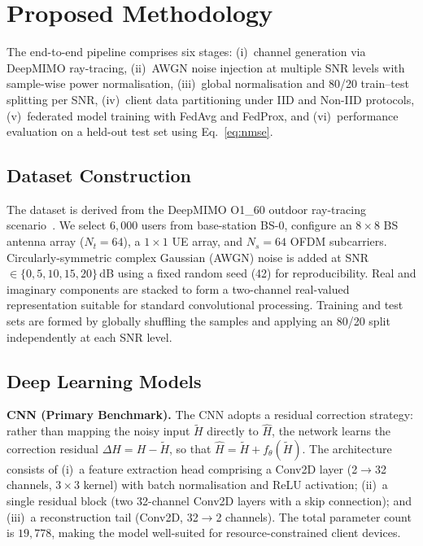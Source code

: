 \documentclass[runningheads]{llncs}
\begin{document}
\section{Proposed Methodology}
\label{sec:method}

The end-to-end pipeline comprises six stages:
(i)~channel generation via DeepMIMO ray-tracing,
(ii)~AWGN noise injection at multiple SNR levels with sample-wise power
normalisation,
(iii)~global normalisation and 80/20 train--test splitting per SNR,
(iv)~client data partitioning under IID and Non-IID protocols,
(v)~federated model training with FedAvg and FedProx,
and (vi)~performance evaluation on a held-out test set using
Eq.~\eqref{eq:nmse}.

\subsection{Dataset Construction}
\label{ssec:dataset}

The dataset is derived from the DeepMIMO O1\_60 outdoor ray-tracing
scenario~\cite{alkhateeb2019deepmimo}.  We select $6{,}000$ users from
base-station BS-0, configure an $8 \times 8$ BS antenna array ($N_t =
64$), a $1 \times 1$ UE array, and $N_s = 64$ OFDM subcarriers.
Circularly-symmetric complex Gaussian (AWGN) noise is added at
SNR~$\in \{0, 5, 10, 15, 20\}$\,dB using a fixed random seed (42) for
reproducibility.  Real and imaginary components are stacked to form a
two-channel real-valued representation suitable for standard
convolutional processing.  Training and test sets are formed by globally
shuffling the samples and applying an 80/20 split independently at each
SNR level.

\subsection{Deep Learning Models}
\label{ssec:models}

\textbf{CNN (Primary Benchmark).}
The CNN adopts a residual correction strategy: rather than mapping the
noisy input $\tilde{H}$ directly to $\hat{H}$, the network learns the
correction residual $\Delta H = H - \tilde{H}$, so that
$\hat{H} = \tilde{H} + f_\theta(\tilde{H})$.  The architecture consists
of (i)~a feature extraction head comprising a Conv2D layer (2$\to$32
channels, $3\times 3$ kernel) with batch normalisation and ReLU
activation; (ii)~a single residual block (two 32-channel Conv2D layers
with a skip connection); and (iii)~a reconstruction tail (Conv2D,
32$\to$2 channels).  The total parameter count is $19{,}778$, making the
model well-suited for resource-constrained client devices.
\end{document}
